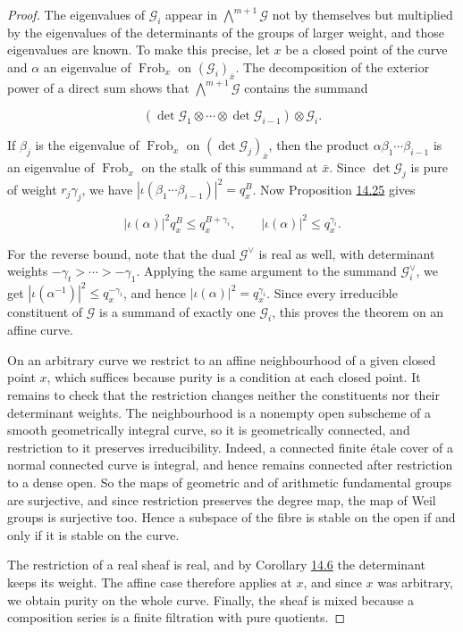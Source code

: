 \documentclass[11pt]{article}
\begin{document}
\begin{proof}[{Proof}]
The eigenvalues of \(\mathcal G_i\) appear in \(\bigwedge^{m+1}\mathcal G\) not by themselves but multiplied by the eigenvalues of the determinants of the groups of larger weight, and those eigenvalues are known. To make this precise, let \(x\) be a closed point of the curve and \(\alpha\) an eigenvalue of \(\operatorname{Frob}_x\) on \((\mathcal G_i)_{\bar x}\). The decomposition of the exterior power of a direct sum shows that \(\bigwedge^{m+1}\mathcal G\) contains the summand

\[
(\det\mathcal G_1\otimes\cdots\otimes\det\mathcal G_{i-1})
\otimes\mathcal G_i.
\]

If \(\beta_j\) is the eigenvalue of \(\operatorname{Frob}_x\) on \((\det\mathcal G_j)_{\bar x}\), then the product \(\alpha\beta_1\cdots\beta_{i-1}\) is an eigenvalue of \(\operatorname{Frob}_x\) on the stalk of this summand at \(\bar x\). Since \(\det\mathcal G_j\) is pure of weight \(r_j\gamma_j\), we have \(|\iota(\beta_1\cdots\beta_{i-1})|^2=q_x^B\). Now Proposition \hyperref[bp78]{14.25} gives

\[
|\iota(\alpha)|^2q_x^B\le q_x^{B+\gamma_i},
\qquad |\iota(\alpha)|^2\le q_x^{\gamma_i}.
\]

For the reverse bound, note that the dual \(\mathcal G^\vee\) is real as well, with determinant weights \(-\gamma_t>\cdots>-\gamma_1\). Applying the same argument to the summand \(\mathcal G_i^\vee\), we get \(|\iota(\alpha^{-1})|^2\le q_x^{-\gamma_i}\), and hence \(|\iota(\alpha)|^2=q_x^{\gamma_i}\). Since every irreducible constituent of \(\mathcal G\) is a summand of exactly one \(\mathcal G_i\), this proves the theorem on an affine curve.

On an arbitrary curve we restrict to an affine neighbourhood of a given closed point \(x\), which suffices because purity is a condition at each closed point. It remains to check that the restriction changes neither the constituents nor their determinant weights. The neighbourhood is a nonempty open subscheme of a smooth geometrically integral curve, so it is geometrically connected, and restriction to it preserves irreducibility. Indeed, a connected finite étale cover of a normal connected curve is integral, and hence remains connected after restriction to a dense open. So the maps of geometric and of arithmetic fundamental groups are surjective, and since restriction preserves the degree map, the map of Weil groups is surjective too. Hence a subspace of the fibre is stable on the open if and only if it is stable on the curve.

The restriction of a real sheaf is real, and by Corollary \hyperref[bp23]{14.6} the determinant keeps its weight. The affine case therefore applies at \(x\), and since \(x\) was arbitrary, we obtain purity on the whole curve. Finally, the sheaf is mixed because a composition series is a finite filtration with pure quotients.
\end{proof}
\end{document}
